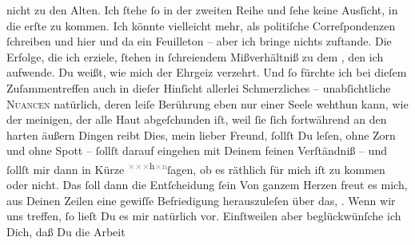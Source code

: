 \begin{ledgroupsized}[t]{13cm}
               nicht zu den Alten. Ich ſtehe ſo {\pb}in der zweiten
               Reihe und ſehe keine Ausſicht, in die erſte zu kommen. Ich könnte vielleicht mehr,
               als politiſche Correſpondenzen ſchreiben und hier und da ein Feuilleton – aber ich
               bringe nichts zuftande. Die Erfolge, die ich erziele, ſtehen in ſchreiendem
               Mißverhältniß zu dem \label{K_L02608-21v}\label{K_L02608-21h}, den
               ich aufwende. Du weißt, wie mich der Ehrgeiz verzehrt.  Und ſo fürchte ich bei dieſem Zuſammentreffen auch in dieſer Hinſicht
               allerlei Schmerzliches – unabſichtliche \textsc{Nuancen} natürlich,
                   deren leiſe Berührung eben nur einer Seele
               wehthun  kann, wie der meinigen, der alle Haut
               abgeſchunden iſt, weil ſie ſich fortwährend an den harten {\pb}äußern Dingen reibt{\dotsfive}\pend
           \pstart
           Dies, mein lieber Freund, ſollſt Du leſen, ohne Zorn und ohne Spott – ſollſt darauf
               eingehen mit Deinem feinen Verſtändniß – und ſollſt mir dann in Kürze \substVorne{}\textsuperscript{\textcolor{gray}{×}\-\textcolor{gray}{×}\-\textcolor{gray}{×}h\textcolor{gray}{×}\textcolor{gray}{n}}\substDazwischen{}ſagen\substHinten{}, ob  es räthlich für mich iſt zu kommen oder
               nicht. Das ſoll dann die Entſcheidung ſein{\dotsfour}\pend
           \pstart
           Von ganzem Herzen freut es mich, aus Deinen Zeilen eine gewiſſe Befriedigung
                  herauszuleſen\strikeout{,} über das, \label{K_L02608-4v}\label{K_L02608-4h}. Wenn wir uns treffen, ſo lieſt Du es mir
                  {\pb}natürlich vor. Einſtweilen aber beglückwünſche
               ich Dich, daß Du die Arbeit

\end{ledgroupsized}
